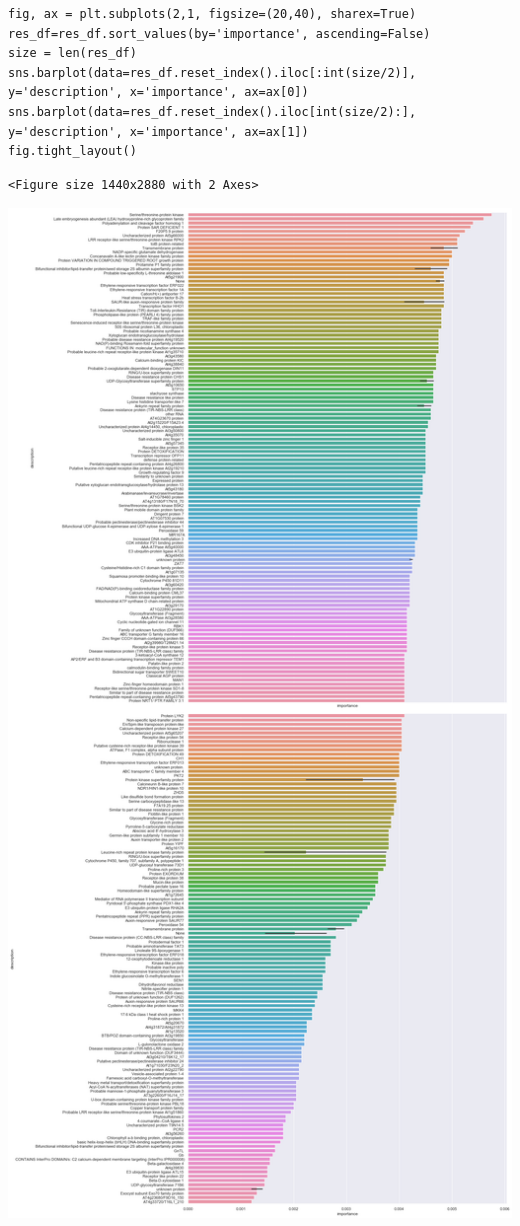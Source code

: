 \documentclass[11pt]{article}
\begin{document}
\begin{verbatim}
fig, ax = plt.subplots(2,1, figsize=(20,40), sharex=True)
res_df=res_df.sort_values(by='importance', ascending=False)
size = len(res_df)
sns.barplot(data=res_df.reset_index().iloc[:int(size/2)], y='description', x='importance', ax=ax[0])
sns.barplot(data=res_df.reset_index().iloc[int(size/2):], y='description', x='importance', ax=ax[1])
fig.tight_layout()
\end{verbatim}

\begin{verbatim}
<Figure size 1440x2880 with 2 Axes>
\end{verbatim}


\begin{center}
\includegraphics[width=.9\linewidth]{obipy-resources/93e2fbf76ed477962282ae99767b8408de4d3ed9/703f60afdc6ffbfb23a6c0113ee865a2ebf33ef0.png}
\end{center}
\end{document}
